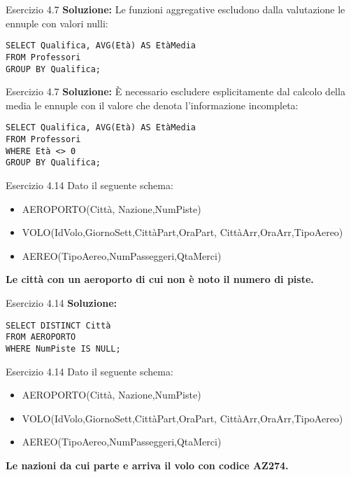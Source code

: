 \begin{frame}{Esercizio 4.7}
    \textbf{Soluzione:}
    Le funzioni aggregative escludono dalla valutazione le ennuple con valori nulli:
    \vspace{1em}
    
    \texttt{SELECT Qualifica, AVG(Et\`a) AS Et\`aMedia\\FROM Professori\\GROUP BY Qualifica;}
\end{frame}

\begin{frame}{Esercizio 4.7}
    \textbf{Soluzione:}
    \`E necessario escludere esplicitamente dal calcolo della media le ennuple con il valore che denota l'informazione incompleta:
    \vspace{1em}
    
    \texttt{SELECT Qualifica, AVG(Et\`a) AS Et\`aMedia\\FROM Professori\\WHERE Et\`a <> 0\\GROUP BY Qualifica;}
\end{frame}
\begin{frame}{Esercizio 4.14}
    Dato il seguente schema:
    \begin{itemize}
        \item AEROPORTO(Citt\`a, Nazione,NumPiste)
        \item VOLO(IdVolo,GiornoSett,Citt\`aPart,OraPart,
        Citt\`aArr,OraArr,TipoAereo)
        \item AEREO(TipoAereo,NumPasseggeri,QtaMerci)
    \end{itemize}
    \vspace{1em}
    
    \textbf{Le citt\`a con un aeroporto di cui non \`e noto il numero di piste.}
\end{frame}

\begin{frame}{Esercizio 4.14}
    \textbf{Soluzione:}
    \vspace{1em}
    
    \texttt{SELECT DISTINCT Citt\`a\\FROM AEROPORTO\\WHERE NumPiste IS NULL;}
    \end{frame}
\begin{frame}{Esercizio 4.14}
    Dato il seguente schema:
    \begin{itemize}
        \item AEROPORTO(Citt\`a, Nazione,NumPiste)
        \item VOLO(IdVolo,GiornoSett,Citt\`aPart,OraPart,
        Citt\`aArr,OraArr,TipoAereo)
        \item AEREO(TipoAereo,NumPasseggeri,QtaMerci)
    \end{itemize}
    \vspace{1em}
    
    \textbf{Le nazioni da cui parte e arriva il volo con codice AZ274.}
\end{frame}

